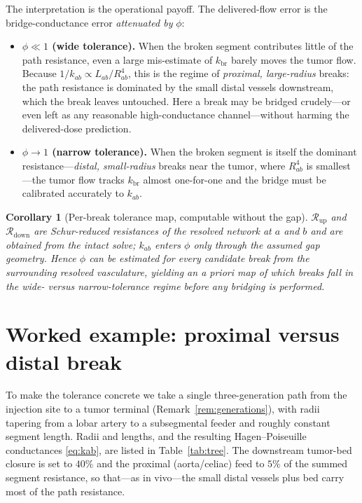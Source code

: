 \documentclass[11pt]{article}
\newtheorem{corollary}{Corollary}
\newcommand{\Rup}{\mathcal{R}_{\mathrm{up}}}
\newcommand{\Rdown}{\mathcal{R}_{\mathrm{down}}}
\newcommand{\kbr}{k_{\mathrm{br}}}
\begin{document}
\noindent
The interpretation is the operational payoff. The delivered-flow error is the
bridge-conductance error \emph{attenuated by} $\phi$:
\begin{itemize}
\item \textbf{$\phi \ll 1$ (wide tolerance).} When the broken segment contributes
little of the path resistance, even a large mis-estimate of $\kbr$ barely moves the
tumor flow. Because $1/k_{ab}\propto L_{ab}/R_{ab}^4$, this is the regime of
\emph{proximal, large-radius} breaks: the path resistance is dominated by the small
distal vessels downstream, which the break leaves untouched. Here a break may be
bridged crudely---or even left as any reasonable high-conductance channel---without
harming the delivered-dose prediction.
\item \textbf{$\phi \to 1$ (narrow tolerance).} When the broken segment is itself
the dominant resistance---\emph{distal, small-radius} breaks near the tumor, where
$R_{ab}^4$ is smallest---the tumor flow tracks $\kbr$ almost one-for-one and the
bridge must be calibrated accurately to $k_{ab}$.
\end{itemize}

\begin{corollary}[Per-break tolerance map, computable without the gap]
\label{cor:map}
$\Rup$ and $\Rdown$ are Schur-reduced resistances of the \emph{resolved} network
at $a$ and $b$ and are obtained from the intact solve; $k_{ab}$ enters $\phi$ only
through the assumed gap geometry. Hence $\phi$ can be estimated for every candidate
break from the surrounding resolved vasculature, yielding an a priori map of which
breaks fall in the wide- versus narrow-tolerance regime before any bridging is
performed.
\end{corollary}

\section{Worked example: proximal versus distal break}
\label{sec:example}

To make the tolerance concrete we take a single three-generation path from the
injection site to a tumor terminal (Remark~\ref{rem:generations}), with radii
tapering from a lobar artery to a subsegmental feeder and roughly constant segment
length. Radii and lengths, and the resulting Hagen--Poiseuille conductances
\eqref{eq:kab}, are listed in Table~\ref{tab:tree}. The downstream tumor-bed
closure is set to $40\%$ and the proximal (aorta/celiac) feed to $5\%$ of the summed
segment resistance, so that---as in vivo---the small distal vessels plus bed carry
most of the path resistance.
\end{document}
